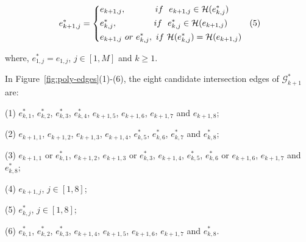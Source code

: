 \vspace{-2ex}
\begin{equation*}
\label{equ-inter-edge-it}
    \begin{aligned}
        \hspace{1ex}  e^*_{k+1, j} = \left\{
            \begin{aligned}
                & e_{k+1, j},   \hspace{8ex}if~~ e_{k+1,j} \in \mathcal{H}(e^*_{k,j}) \\
                & e^*_{k, j},   \hspace{10ex}if~~ e^*_{k,j} \in \mathcal{H}(e_{k+1,j})      \hspace{6ex} (5)  \\
                & e_{k+1, j} ~or~ e^*_{k, j}, ~if~ \mathcal{H}(e^*_{k,j}) = \mathcal{H}(e_{k+1,j}) \\
            \end{aligned}
        \right.
    \end{aligned}
\end{equation*}
\vspace{-1ex}

where,  $e^*_{1, j} = e_{1, j}$, $j \in [1, M]$ and $k\ge 1$.



\begin{example}
In Figure~\ref{fig:poly-edges}(1)-(6), the eight candidate intersection edges of $\mathcal{G}^*_{k+1}$ are:

(1) $e^*_{k,1}$, $e^*_{k,2}$, $e^*_{k,3}$, $e^*_{k,4}$, $e_{k+1,5}$, $e_{k+1,6}$, $e_{k+1,7}$ and $e_{k+1,8}$;

(2) $e_{k+1,1}$, $e_{k+1,2}$, $e_{k+1,3}$, $e_{k+1,4}$, $e^*_{k,5}$, $e^*_{k,6}$, $e^*_{k,7}$ and $e^*_{k,8}$;

(3) $e_{k+1,1}$ or $e^*_{k,1}$, $e_{k+1,2}$, $e_{k+1,3}$ or $e^*_{k,3}$, $e_{k+1,4}$, $e^*_{k,5}$, $e^*_{k,6}$ or $e_{k+1,6}$, $e_{k+1,7}$ and $e^*_{k,8}$;

(4) $e_{k+1,j}$, $j \in [1, 8]$;

(5) $e^*_{k,j}$, $j \in [1, 8]$;

(6) $e^*_{k,1}$, $e^*_{k,2}$, $e^*_{k,3}$, $e_{k+1,4}$, $e_{k+1,5}$, $e_{k+1,6}$, $e_{k+1,7}$ and $e^*_{k,8}$.


\end{example}





